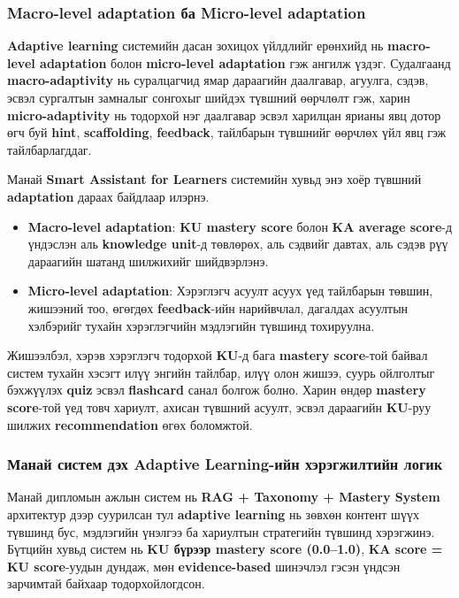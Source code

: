 \documentclass[12pt,A4]{report}
\begin{document}
\subsubsection*{Macro-level adaptation ба Micro-level adaptation}

\textbf{Adaptive learning} системийн дасан зохицох үйлдлийг ерөнхийд нь \textbf{macro-level adaptation} болон \textbf{micro-level adaptation} гэж ангилж үздэг. Судалгаанд \textbf{macro-adaptivity} нь суралцагчид ямар дараагийн даалгавар, агуулга, сэдэв, эсвэл сургалтын замналыг сонгохыг шийдэх түвшний өөрчлөлт гэж, харин \textbf{micro-adaptivity} нь тодорхой нэг даалгавар эсвэл харилцан ярианы явц дотор өгч буй \textbf{hint}, \textbf{scaffolding}, \textbf{feedback}, тайлбарын түвшнийг өөрчлөх үйл явц гэж тайлбарлагддаг.

Манай \textbf{Smart Assistant for Learners} системийн хувьд энэ хоёр түвшний \textbf{adaptation} дараах байдлаар илэрнэ.

\begin{itemize}
    \item \textbf{Macro-level adaptation}: \textbf{KU mastery score} болон \textbf{KA average score}-д үндэслэн аль \textbf{knowledge unit}-д төвлөрөх, аль сэдвийг давтах, аль сэдэв рүү дараагийн шатанд шилжихийг шийдвэрлэнэ.
    \item \textbf{Micro-level adaptation}: Хэрэглэгч асуулт асуух үед тайлбарын төвшин, жишээний тоо, өгөгдөх \textbf{feedback}-ийн нарийвчлал, дагалдах асуултын хэлбэрийг тухайн хэрэглэгчийн мэдлэгийн түвшинд тохируулна.
\end{itemize}

Жишээлбэл, хэрэв хэрэглэгч тодорхой \textbf{KU}-д бага \textbf{mastery score}-той байвал систем тухайн хэсэгт илүү энгийн тайлбар, илүү олон жишээ, суурь ойлголтыг бэхжүүлэх \textbf{quiz} эсвэл \textbf{flashcard} санал болгож болно. Харин өндөр \textbf{mastery score}-той үед товч хариулт, ахисан түвшний асуулт, эсвэл дараагийн \textbf{KU}-руу шилжих \textbf{recommendation} өгөх боломжтой.

\subsubsection*{Манай систем дэх Adaptive Learning-ийн хэрэгжилтийн логик}

Манай дипломын ажлын систем нь \textbf{RAG + Taxonomy + Mastery System} архитектур дээр суурилсан тул \textbf{adaptive learning} нь зөвхөн контент шүүх түвшинд бус, мэдлэгийн үнэлгээ ба хариултын стратегийн түвшинд хэрэгжинэ. Бүтцийн хувьд систем нь \textbf{KU бүрээр mastery score (0.0--1.0)}, \textbf{KA score = KU score}-уудын дундаж, мөн \textbf{evidence-based} шинэчлэл гэсэн үндсэн зарчимтай байхаар тодорхойлогдсон.
\end{document}
